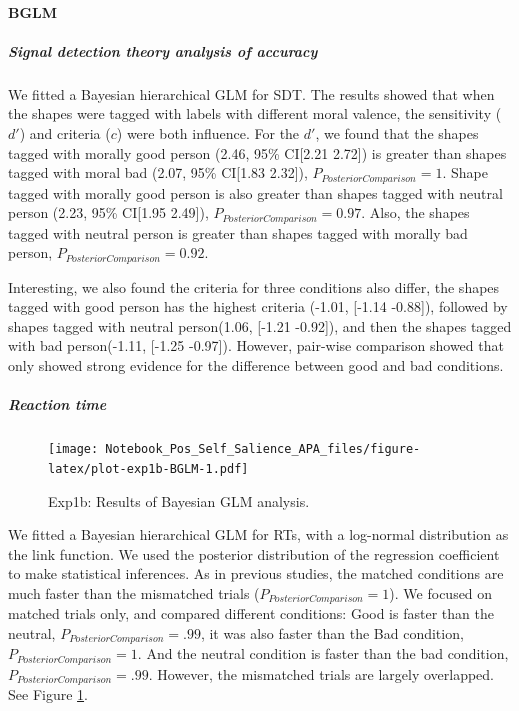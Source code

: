 \documentclass[
  english,
  man]{apa6}
\let\oldparagraph\paragraph
\renewcommand{\paragraph}[1]{\oldparagraph{#1}\mbox{}}
\let\oldsubparagraph\subparagraph
\renewcommand{\subparagraph}[1]{\oldsubparagraph{#1}\mbox{}}
\begin{document}
\hypertarget{bglm}{%
\paragraph{BGLM}\label{bglm}}

\hypertarget{signal-detection-theory-analysis-of-accuracy}{%
\subparagraph{Signal detection theory analysis of accuracy}\label{signal-detection-theory-analysis-of-accuracy}}

We fitted a Bayesian hierarchical GLM for SDT. The results showed that when the shapes were tagged with labels with different moral valence, the sensitivity (\(d'\)) and criteria (\(c\)) were both influence. For the \(d'\), we found that the shapes tagged with morally good person (2.46, 95\% CI{[}2.21 2.72{]}) is greater than shapes tagged with moral bad (2.07, 95\% CI{[}1.83 2.32{]}), \(P_{PosteriorComparison} = 1\). Shape tagged with morally good person is also greater than shapes tagged with neutral person (2.23, 95\% CI{[}1.95 2.49{]}), \(P_{PosteriorComparison} = 0.97\). Also, the shapes tagged with neutral person is greater than shapes tagged with morally bad person, \(P_{PosteriorComparison} = 0.92\).

Interesting, we also found the criteria for three conditions also differ, the shapes tagged with good person has the highest criteria (-1.01, {[}-1.14 -0.88{]}), followed by shapes tagged with neutral person(1.06, {[}-1.21 -0.92{]}), and then the shapes tagged with bad person(-1.11, {[}-1.25 -0.97{]}). However, pair-wise comparison showed that only showed strong evidence for the difference between good and bad conditions.

\hypertarget{reaction-time-1}{%
\subparagraph{Reaction time}\label{reaction-time-1}}

\begin{figure}
\centering
\texttt{[image: Notebook\_Pos\_Self\_Salience\_APA\_files/figure-latex/plot-exp1b-BGLM-1.pdf]}
\caption{\label{fig:plot-exp1b-BGLM}Exp1b: Results of Bayesian GLM analysis.}
\end{figure}

We fitted a Bayesian hierarchical GLM for RTs, with a log-normal distribution as the link function. We used the posterior distribution of the regression coefficient to make statistical inferences. As in previous studies, the matched conditions are much faster than the mismatched trials (\(P_{PosteriorComparison} = 1\)). We focused on matched trials only, and compared different conditions: Good is faster than the neutral, \(P_{PosteriorComparison} = .99\), it was also faster than the Bad condition, \(P_{PosteriorComparison} = 1\). And the neutral condition is faster than the bad condition, \(P_{PosteriorComparison} = .99\). However, the mismatched trials are largely overlapped. See Figure \ref{fig:plot-exp1b-BGLM}.
\end{document}
